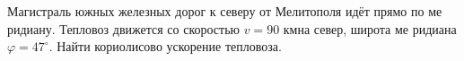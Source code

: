 Магистраль южных железных дорог к северу от Мелитополя идёт прямо по ме
ридиану. Тепловоз движется со скоростью $v=90$ км\ч на север, широта ме
ридиана $\varphi=47^\circ$. Найти кориолисово ускорение тепловоза.
